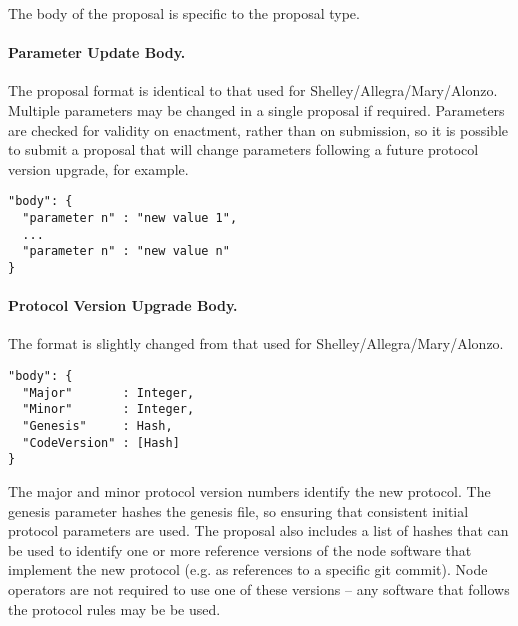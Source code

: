 The body of the proposal is specific to the proposal type.

\newpage
\paragraph{Parameter Update Body.}  The proposal format is identical to that used for Shelley/Allegra/Mary/Alonzo.   Multiple parameters may be changed in a single proposal if required.
Parameters are checked for validity on enactment, rather than on submission, so it is possible to submit a proposal that will change parameters following a future protocol version upgrade, for example.


\begin{verbatim}
"body": {
  "parameter n" : "new value 1",
  ...
  "parameter n" : "new value n"
}
\end{verbatim}

\paragraph{Protocol Version Upgrade Body.}  The format is slightly changed from that used for Shelley/Allegra/Mary/Alonzo.


\begin{verbatim}
"body": {
  "Major"       : Integer,
  "Minor"       : Integer,
  "Genesis"     : Hash,
  "CodeVersion" : [Hash]
}
\end{verbatim}

The major and minor protocol version numbers identify the new protocol.  The genesis parameter hashes the genesis file, so ensuring that consistent initial protocol parameters are used.
The proposal also includes a list of hashes that can be used to identify one or more reference versions of the node software that implement the new protocol (e.g. as references to a specific git commit).
Node operators are not required to use one of these versions -- any software that follows the protocol rules may be be used.


